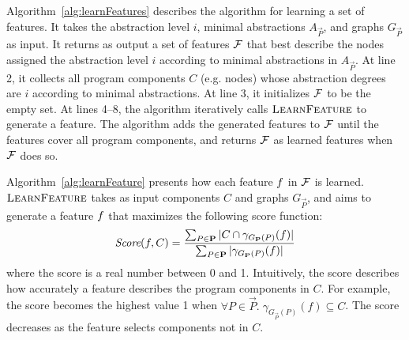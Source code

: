 Algorithm~\ref{alg:learnFeatures} describes the algorithm for learning a set of features.
It takes the abstraction level $i$, minimal abstractions $A_\vec{P}$, and graphs $G_\vec{P}$ as input.
It returns as output a set of features $\mathcal{F}$ that best describe the nodes assigned the abstraction level $i$ according to minimal abstractions in $A_{\vec{P}}$.
At line 2, it collects all program components $C$ (e.g. nodes) whose abstraction degrees are $i$ according to minimal abstractions.
At line 3, it initializes $\mathcal{F}$  to be the empty set.
At lines 4--8, the algorithm iteratively calls ${\textsc{LearnFeature}}$ to generate a feature.
The algorithm adds the generated features to $\mathcal{F}$ until the
features cover all program components, and returns $\mathcal{F}$ as learned features when $\mathcal{F}$ does so.




\label{sec:gamma}
Algorithm~\ref{alg:learnFeature} presents how each feature $f$ in $\mathcal{F}$ is learned.
${\textsc{LearnFeature}}$ takes as input components $C$ and graphs $G_\vec{P}$,
and aims to generate a feature $f$ that maximizes the following score function:
\[
{\textit{Score}} (f,C) = {\sum_{P\in\mathbf{P}} |C \cap \gamma_{G_{\mathbf{P}}(P)}({f})  | \over
  \sum_{P\in\mathbf{P}} |\gamma_{G_{\mathbf{P}}(P)}(f) |}
\]
where the score is a real number between 0 and 1.
Intuitively, the score describes how accurately a feature describes the program components in $C$.
For example, the score becomes the highest value 1
when
$\forall{P \in \vec{P}}.\; \gamma_{G_{\vec{P}}(P)}(f) \subseteq C$.
The score decreases as the feature selects components not in $C$.

